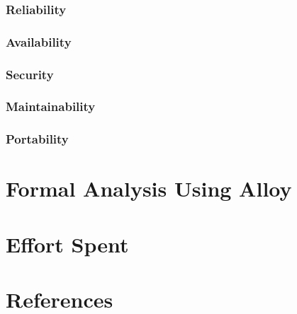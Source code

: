 \documentclass[12pt]{article}
\begin{document}
        \subsubsection{Reliability}
        \subsubsection{Availability}
        \subsubsection{Security}
        \subsubsection{Maintainability}
        \subsubsection{Portability}

\newpage
\section{Formal Analysis Using Alloy}
\section{Effort Spent}
    
\section{References}
\end{document}
